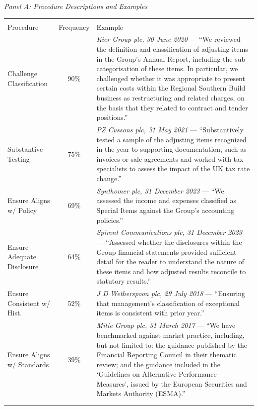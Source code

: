 \footnotesize
\textit{Panel A: Procedure Descriptions and Examples}
\vspace{4pt}

\renewcommand{\arraystretch}{1.3}
\begin{tabular}{p{4.2cm} c p{9.8cm}}
\\[-1.8ex]\hline \hline \\[-1.8ex]
Procedure & Frequency & Example \\
\midrule
Challenge Classification & 90\% &
\textit{Kier Group plc, 30 June 2020} --- ``We reviewed the definition and classification of adjusting items in the Group's Annual Report, including the sub-categorisation of these items. In particular, we challenged whether it was appropriate to present certain costs within the Regional Southern Build business as restructuring and related charges, on the basis that they related to contract and tender positions.'' \\[6pt]
Substantive Testing & 75\% &
\textit{PZ Cussons plc, 31 May 2021} --- ``Substantively tested a sample of the adjusting items recognized in the year to supporting documentation, such as invoices or sale agreements and worked with tax specialists to assess the impact of the UK tax rate change.'' \\[6pt]
Ensure Aligns w/ Policy & 69\% &
\textit{Synthomer plc, 31 December 2023} --- ``We assessed the income and expenses classified as Special Items against the Group's accounting policies.'' \\[6pt]
Ensure Adequate Disclosure & 64\% &
\textit{Spirent Communications plc, 31 December 2023} --- ``Assessed whether the disclosures within the Group financial statements provided sufficient detail for the reader to understand the nature of these items and how adjusted results reconcile to statutory results.'' \\[6pt]
Ensure Consistent w/ Hist. & 52\% &
\textit{J D Wetherspoon plc, 29 July 2018} --- ``Ensuring that management's classification of exceptional items is consistent with prior year.'' \\[6pt]
Ensure Aligns w/ Standards & 39\% &
\textit{Mitie Group plc, 31 March 2017} --- ``We have benchmarked against market practice, including, but not limited to: the guidance published by the Financial Reporting Council in their thematic review; and the guidance included in the `Guidelines on Alternative Performance Measures', issued by the European Securities and Markets Authority (ESMA).'' \\
\\[-1.8ex]\hline \hline \\[-1.8ex]
\end{tabular}
\renewcommand{\arraystretch}{1.0}
